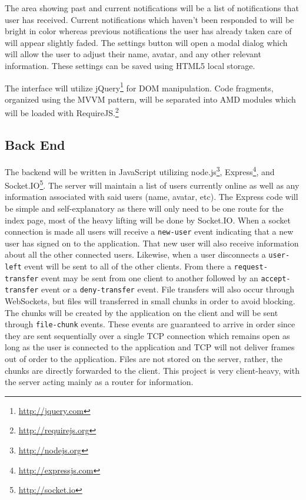 \documentclass[letterpaper, 10pt]{article}
\begin{document}
	The area showing past and current notifications will be a list of notifications that user has received. Current notifications which haven't been responded to will be bright in color whereas previous notifications the user has already taken care of will appear slightly faded. The settings button will open a modal dialog which will allow the user to adjust their name, avatar, and any other relevant information. These settings can be saved using HTML5 local storage.

	The interface will utilize jQuery\footnote{\url{http://jquery.com}} for DOM manipulation. Code fragments, organized using the MVVM pattern, will be separated into AMD modules which will be loaded with RequireJS.\footnote{\url{http://requirejs.org}}

	\subsection{Back End}
	The backend will be written in JavaScript utilizing node.js\footnote{\url{http://nodejs.org}}, Express\footnote{\url{http://expressjs.com}}, and Socket.IO\footnote{\url{http://socket.io}}. The server will maintain a list of users currently online as well as any information associated with said users (name, avatar, etc). The Express code will be simple and self-explanatory as there will only need to be one route for the index page, most of the heavy lifting will be done by Socket.IO. When a socket connection is made all users will receive a \texttt{new-user} event indicating that a new user has signed on to the application. That new user will also receive information about all the other connected users. Likewise, when a user disconnects a \texttt{user-left} event will be sent to all of the other clients. From there a \texttt{request-transfer} event may be sent from one client to another followed by an \texttt{accept-transfer} event or a \texttt{deny-transfer} event. File transfers will also occur through WebSockets, but files will transferred in small chunks in order to avoid blocking. The chunks will be created by the application on the client and will be sent through \texttt{file-chunk} events. These events are guaranteed to arrive in order since they are sent sequentially over a single TCP connection which remains open as long as the user is connected to the application and TCP will not deliver frames out of order to the application. Files are not stored on the server, rather, the chunks are directly forwarded to the client. This project is very client-heavy, with the server acting mainly as a router for information.
\end{document}
